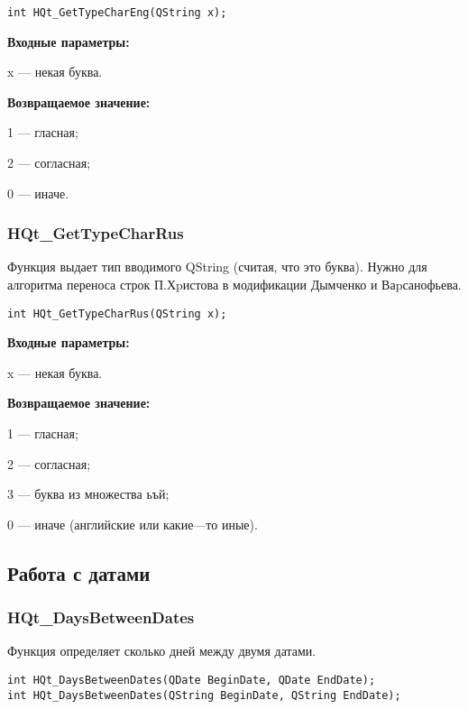 \documentclass[a4paper,12pt]{article}
\begin{document}
\begin{lstlisting}[label=code_syntax_HQt_GetTypeCharEng,caption=Синтаксис]
int HQt_GetTypeCharEng(QString x);
\end{lstlisting}

\textbf{Входные параметры:}

x --- некая буква.

\textbf{Возвращаемое значение:}

     1 --- гласная;
	 
     2 --- согласная;
	 
     0 --- иначе.


\subsubsection{HQt\_GetTypeCharRus}\label{HQt_GetTypeCharRus}

Функция выдает тип вводимого QString (считая, что это буква). Нужно для алгоритма переноса строк П.Хpистова в модификации Дымченко и Ваpсанофьева.


\begin{lstlisting}[label=code_syntax_HQt_GetTypeCharRus,caption=Синтаксис]
int HQt_GetTypeCharRus(QString x);
\end{lstlisting}

\textbf{Входные параметры:}

x --- некая буква.

\textbf{Возвращаемое значение:}

    1 --- гласная;
 
    2 --- согласная;
 
    3 --- буква из множества ьъй;
 
    0 --- иначе (английские или какие---то иные).


\subsection{Работа с датами}

\subsubsection{HQt\_DaysBetweenDates}\label{HQt_DaysBetweenDates}

Функция определяет сколько дней между двумя датами.


\begin{lstlisting}[label=code_syntax_HQt_DaysBetweenDates,caption=Синтаксис]
int HQt_DaysBetweenDates(QDate BeginDate, QDate EndDate);
int HQt_DaysBetweenDates(QString BeginDate, QString EndDate);
\end{lstlisting}
\end{document}

